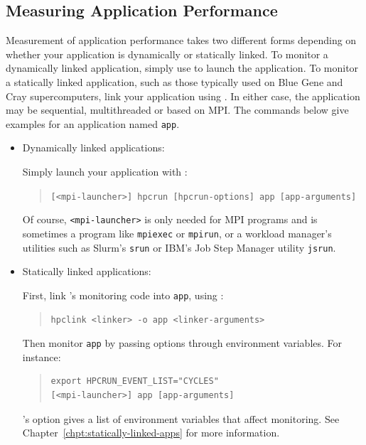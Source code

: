\documentclass[11pt,letterpaper]{report}
\begin{document}

\subsection{Measuring Application Performance}
\label{chpt:quickstart:tour:measurement}

Measurement of application performance takes two different forms depending on whether your application is dynamically or statically linked.
To monitor a dynamically linked application, simply use \hpcrun{} to launch the application.
To monitor a statically linked application, such as those typically used on Blue Gene and Cray supercomputers, link your application using \hpclink{}.
In either case, the application may be sequential, multithreaded or based on MPI.
The commands below give examples for an application named \texttt{app}.
%
\begin{itemize}

\item Dynamically linked applications:\hfill

Simply launch your application with \hpcrun{}:
\begin{quote}
  \verb|[<mpi-launcher>] hpcrun [hpcrun-options] app [app-arguments]|
\end{quote}
Of course, \texttt{<mpi-launcher>} is only needed for MPI programs and is sometimes a program like \texttt{mpiexec} or \texttt{mpirun}, or a workload manager's utilities such as Slurm's {\tt srun} or IBM's Job Step Manager utility {\tt jsrun}.

\item Statically linked applications:\hfill

First, link \hpcrun{}'s monitoring code into \texttt{app}, using \hpclink{}:
\begin{quote}
  \verb|hpclink <linker> -o app <linker-arguments>|
\end{quote}

Then monitor \texttt{app} by passing \hpcrun{} options through environment variables.
For instance:
\begin{quote}
\begin{verbatim}
export HPCRUN_EVENT_LIST="CYCLES"
[<mpi-launcher>] app [app-arguments]
\end{verbatim}
\end{quote}
\hpclink{}'s  option gives a list of environment variables that affect monitoring.
See Chapter~\ref{chpt:statically-linked-apps} for more information.

\end{itemize}
\end{document}
